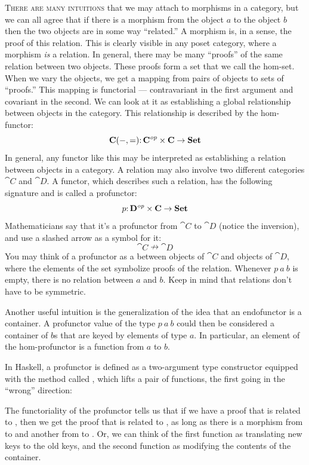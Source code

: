 
\lettrine[lhang=0.17]{T}{here are many intuitions} that we may attach to morphisms in a category,
but we can all agree that if there is a morphism from the object
$a$ to the object $b$ then the two objects are in some way
``related.'' A morphism is, in a sense, the proof of this relation. This
is clearly visible in any poset category, where a morphism \emph{is} a
relation. In general, there may be many ``proofs'' of the same relation
between two objects. These proofs form a set that we call the hom-set.
When we vary the objects, we get a mapping from pairs of objects to sets
of ``proofs.'' This mapping is functorial --- contravariant in the first
argument and covariant in the second. We can look at it as establishing
a global relationship between objects in the category. This relationship
is described by the hom-functor:
\[\mathbf{C}(-, =) \mathpunct{:} \mathbf{C}^\mathit{op}\times{}\mathbf{C} \to \mathbf{Set}\]
In general, any functor like this may be interpreted as establishing a
relation between objects in a category. A relation may also involve two
different categories $\cat{C}$ and $\cat{D}$. A functor, which describes
such a relation, has the following signature and is called a profunctor:
\[p \mathpunct{:} \mathbf{D}^\mathit{op}\times{}\mathbf{C} \to \mathbf{Set}\]
Mathematicians say that it's a profunctor from $\cat{C}$ to $\cat{D}$
(notice the inversion), and use a slashed arrow as a symbol for it:
\[\cat{C} \nrightarrow \cat{D}\]
You may think of a profunctor as a 
between objects of $\cat{C}$ and objects of $\cat{D}$, where the elements
of the set symbolize proofs of the relation. Whenever $p\ a\ b$
is empty, there is no relation between $a$ and $b$. Keep
in mind that relations don't have to be symmetric.

Another useful intuition is the generalization of the idea that an
endofunctor is a container. A profunctor value of the type
$p\ a\ b$ could then be considered a container of $b$s
that are keyed by elements of type $a$. In particular, an element
of the hom-profunctor is a function from $a$ to $b$.

In Haskell, a profunctor is defined as a two-argument type constructor
 equipped with the method called , which lifts a
pair of functions, the first going in the ``wrong'' direction:

The functoriality of the profunctor tells us that if we have a proof
that  is related to , then we get the proof that
 is related to , as long as there is a morphism from
 to  and another from  to . Or,
we can think of the first function as translating new keys to the old
keys, and the second function as modifying the contents of the
container.


